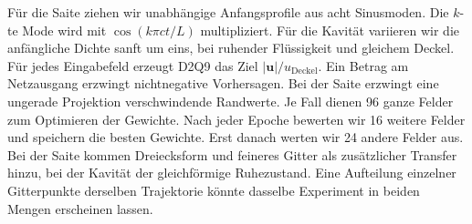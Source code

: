 Für die Saite ziehen wir unabhängige Anfangsprofile aus acht Sinusmoden. Die \(k\)-te Mode wird mit \(\cos(k\pi ct/L)\) multipliziert. Für die Kavität variieren wir die anfängliche Dichte sanft um eins, bei ruhender Flüssigkeit und gleichem Deckel. Für jedes Eingabefeld erzeugt D2Q9 das Ziel \(|\mathbf u|/u_\mathrm{Deckel}\). Ein Betrag am Netzausgang erzwingt nichtnegative Vorhersagen. Bei der Saite erzwingt eine ungerade Projektion verschwindende Randwerte.
Je Fall dienen 96 ganze Felder zum Optimieren der Gewichte. Nach jeder Epoche bewerten wir 16 weitere Felder und speichern die besten Gewichte. Erst danach werten wir 24 andere Felder aus. Bei der Saite kommen Dreiecksform und feineres Gitter als zusätzlicher Transfer hinzu, bei der Kavität der gleichförmige Ruhezustand. Eine Aufteilung einzelner Gitterpunkte derselben Trajektorie könnte dasselbe Experiment in beiden Mengen erscheinen lassen.

